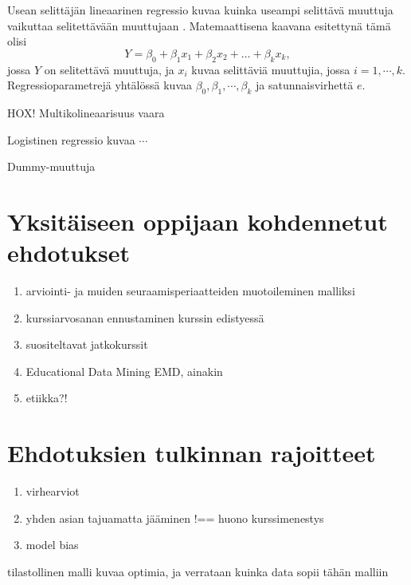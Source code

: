 Usean selittäjän lineaarinen regressio kuvaa kuinka useampi selittävä muuttuja vaikuttaa selitettävään muuttujaan \cite{rossIntroductoryStatistics2017}. Matemaattisena kaavana esitettynä tämä olisi $$Y = \beta_0 + \beta_1x_1 + \beta_2x_2 + \ldots + \beta_kx_k,$$ jossa $Y$ on selitettävä muuttuja, ja $x_i$ kuvaa selittäviä muuttujia, jossa $i = 1, \cdots, k$. Regressioparametrejä yhtälössä kuvaa $\beta_0, \beta_1, \cdots, \beta_k$ ja satunnaisvirhettä $e$.

HOX! Multikolineaarisuus vaara

Logistinen regressio kuvaa $\cdots$

Dummy-muuttuja







\section{Yksitäiseen oppijaan kohdennetut ehdotukset}

\begin{enumerate}
    \item arviointi- ja muiden seuraamisperiaatteiden muotoileminen malliksi
    \item kurssiarvosanan ennustaminen kurssin edistyessä
    \item suositeltavat jatkokurssit
    \item Educational Data Mining EMD, ainakin \cite{romeroEducationalDataMining2010}
    \item etiikka?! \cite{kailaEthicalConsiderationsLearning2019}
\end{enumerate}

\section{Ehdotuksien tulkinnan rajoitteet}  

\begin{enumerate}
    \item virhearviot
    \item yhden asian tajuamatta jääminen !== huono kurssimenestys
    \item model bias
\end{enumerate}


tilastollinen malli kuvaa optimia, ja verrataan kuinka data sopii tähän malliin